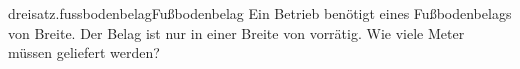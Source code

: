 \begin{exercise}{dreisatz.fussbodenbelag}{Fußbodenbelag}
  \ifproblem\problem
    Ein Betrieb benötigt  eines Fußbodenbelags von  Breite.
    Der Belag ist nur in einer Breite von  vorrätig. Wie viele Meter
    müssen geliefert werden?
  \fi
\end{exercise}
